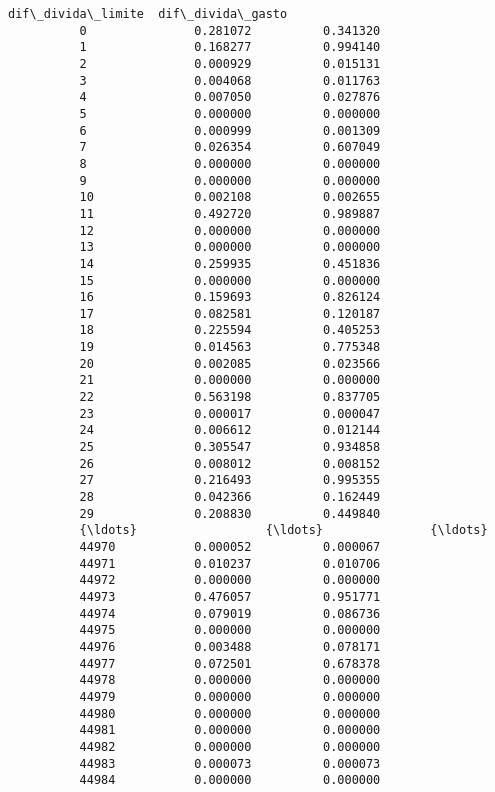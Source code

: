 \documentclass[11pt]{article}
\begin{document}
\begin{Verbatim}[commandchars=\\\{\}]
                 dif\_divida\_limite  dif\_divida\_gasto  
          0               0.281072          0.341320  
          1               0.168277          0.994140  
          2               0.000929          0.015131  
          3               0.004068          0.011763  
          4               0.007050          0.027876  
          5               0.000000          0.000000  
          6               0.000999          0.001309  
          7               0.026354          0.607049  
          8               0.000000          0.000000  
          9               0.000000          0.000000  
          10              0.002108          0.002655  
          11              0.492720          0.989887  
          12              0.000000          0.000000  
          13              0.000000          0.000000  
          14              0.259935          0.451836  
          15              0.000000          0.000000  
          16              0.159693          0.826124  
          17              0.082581          0.120187  
          18              0.225594          0.405253  
          19              0.014563          0.775348  
          20              0.002085          0.023566  
          21              0.000000          0.000000  
          22              0.563198          0.837705  
          23              0.000017          0.000047  
          24              0.006612          0.012144  
          25              0.305547          0.934858  
          26              0.008012          0.008152  
          27              0.216493          0.995355  
          28              0.042366          0.162449  
          29              0.208830          0.449840  
          {\ldots}                  {\ldots}               {\ldots}  
          44970           0.000052          0.000067  
          44971           0.010237          0.010706  
          44972           0.000000          0.000000  
          44973           0.476057          0.951771  
          44974           0.079019          0.086736  
          44975           0.000000          0.000000  
          44976           0.003488          0.078171  
          44977           0.072501          0.678378  
          44978           0.000000          0.000000  
          44979           0.000000          0.000000  
          44980           0.000000          0.000000  
          44981           0.000000          0.000000  
          44982           0.000000          0.000000  
          44983           0.000073          0.000073  
          44984           0.000000          0.000000  

\end{Verbatim}
\end{document}
